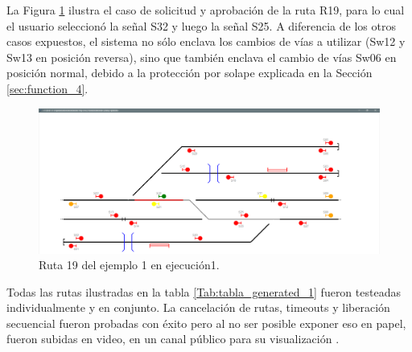 	La Figura \ref{fig:EJ1_AGG_R19}	ilustra el caso de solicitud y aprobación de la ruta R19, para lo cual el usuario seleccionó la señal S32 y luego la señal S25. A diferencia de los otros casos expuestos, el sistema no sólo enclava los cambios de vías a utilizar (Sw12 y Sw13 en posición reversa), sino que también enclava el cambio de vías Sw06 en posición normal, debido a la protección por solape explicada en la Sección \ref{sec:function_4}.	
	
	\begin{figure}[H]
		\centering
		\includegraphics[origin = c, width=1\textwidth]{resultados-obtenidos/ejemplo1/images/AGG_R19}
		\centering\caption{Ruta 19 del ejemplo 1 en ejecución1.}
		\label{fig:EJ1_AGG_R19}
	\end{figure}
	
	Todas las rutas ilustradas en la tabla \ref{Tab:tabla_generated_1} fueron testeadas individualmente y en conjunto. La cancelación de rutas, timeouts y liberación secuencial fueron probadas con éxito pero al no ser posible exponer eso en papel, fueron subidas en video, en un canal público para su visualización \cite{YOUTUBE}.	
	
	